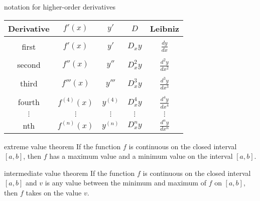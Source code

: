 \documentclass[avery5371,grid]{flashcards}
\begin{document}
\begin{flashcard}[Definition]{notation for higher-order derivatives}
\begin{center}
\begin{footnotesize}
\begin{tabular}{ccccc}
Derivative & $f'(x)$ & $y'$ & $D$ & Leibniz \\ \hline
\\
first &  $f'(x)$ & $y'$ & $D_{x}y$ &  $\frac{dy}{dx}$\\
\\
second &  $f''(x)$ & $y''$ & $D_{x}^{2}y$ &  $\frac{d^{2}\! y}{dx^{2}}$\\
\\
third &  $f'''(x)$ & $y'''$ & $D_{x}^{3}y$ &  $\frac{d^{3}\! y}{dx^{3}}$\\
\\
fourth &  $f^{(4)}(x)$ & $y^{(4)}$ & $D_{x}^{4}y$ &  $\frac{d^{4}\! y}{dx^{4}}$\\
$\vdots$ & $\vdots$ & $\vdots$ & $\vdots$ & $\vdots$ \\
nth &  $f^{(n)}(x)$ & $y^{(n)}$ & $D_{x}^{n}y$ &  $\frac{d^{n}\! y}{dx^{n}}$\\
\end{tabular}
\end{footnotesize}
\end{center}
\end{flashcard}

\begin{flashcard}[Theorem]{extreme value theorem}
If the function $f$ is continuous on the closed interval $[a,b]$,
then $f$ has a maximum value and a minimum value on the interval
$[a,b]$.
\end{flashcard}

\begin{flashcard}[Theorem]{intermediate value theorem}
If the function $f$ is continuous on the closed interval $[a,b]$
and $v$ is any value between the minimum and maximum of $f$ on
$[a,b]$, then $f$ takes on the value $v$.
\end{flashcard}
\end{document}
